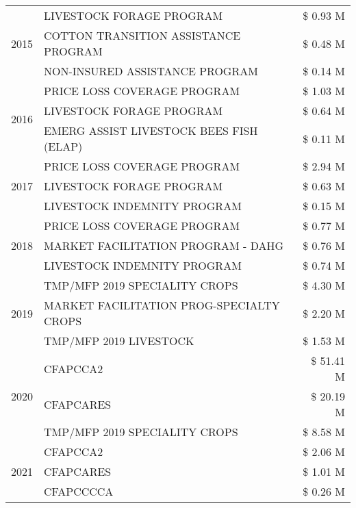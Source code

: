 \begin{tabular}{llr}
\multirow[t]{3}{*}{2015} & LIVESTOCK FORAGE PROGRAM & \$ 0.93 M \\
 & COTTON TRANSITION ASSISTANCE PROGRAM & \$ 0.48 M \\
 & NON-INSURED ASSISTANCE PROGRAM & \$ 0.14 M \\
\cline{1-3}
\multirow[t]{3}{*}{2016} & PRICE LOSS COVERAGE PROGRAM                   & \$ 1.03 M \\
 & LIVESTOCK FORAGE PROGRAM                      & \$ 0.64 M \\
 & EMERG ASSIST LIVESTOCK BEES FISH (ELAP)       & \$ 0.11 M \\
\cline{1-3}
\multirow[t]{3}{*}{2017} & PRICE LOSS COVERAGE PROGRAM & \$ 2.94 M \\
 & LIVESTOCK FORAGE PROGRAM & \$ 0.63 M \\
 & LIVESTOCK INDEMNITY PROGRAM & \$ 0.15 M \\
\cline{1-3}
\multirow[t]{3}{*}{2018} & PRICE LOSS COVERAGE PROGRAM & \$ 0.77 M \\
 & MARKET FACILITATION PROGRAM - DAHG & \$ 0.76 M \\
 & LIVESTOCK INDEMNITY PROGRAM & \$ 0.74 M \\
\cline{1-3}
\multirow[t]{3}{*}{2019} & TMP/MFP 2019 SPECIALITY CROPS & \$ 4.30 M \\
 & MARKET FACILITATION PROG-SPECIALTY CROPS & \$ 2.20 M \\
 & TMP/MFP 2019 LIVESTOCK & \$ 1.53 M \\
\cline{1-3}
\multirow[t]{3}{*}{2020} & CFAPCCA2 & \$ 51.41 M \\
 & CFAPCARES & \$ 20.19 M \\
 & TMP/MFP 2019 SPECIALITY CROPS & \$ 8.58 M \\
\cline{1-3}
\multirow[t]{3}{*}{2021} & CFAPCCA2 & \$ 2.06 M \\
 & CFAPCARES & \$ 1.01 M \\
 & CFAPCCCCA & \$ 0.26 M \\
\cline{1-3}
\bottomrule
\end{tabular}

